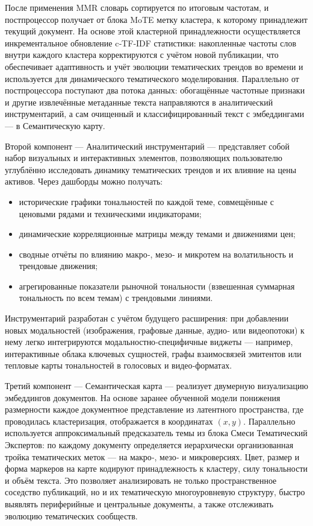 После применения MMR словарь сортируется по итоговым частотам, и постпроцессор получает от блока MoTE метку
кластера, к которому принадлежит текущий документ. На основе этой кластерной принадлежности осуществляется
инкрементальное обновление c‑TF‑IDF статистики: накопленные частоты слов внутри каждого кластера корректируются
с учётом новой публикации, что обеспечивает адаптивность и учёт эволюции тематических трендов во времени
и используется для динамического тематического моделирования. Параллельно от постпроцессора поступают два
потока данных: обогащённые частотные признаки и другие извлечённые метаданные текста направляются
в аналитический инструментарий, а сам очищенный и классифицированный текст с эмбеддингами --- в Семантическую карту.

Второй компонент --- Аналитический инструментарий --- представляет собой набор визуальных и интерактивных элементов,
позволяющих пользователю углублённо исследовать динамику тематических трендов и их влияние на цены активов.
Через дашборды можно получать:

\begin{itemize}
    \item исторические графики тональностей по каждой теме, совмещённые с ценовыми рядами и техническими индикаторами;
    \item динамические корреляционные матрицы между темами и движениями цен;
    \item сводные отчёты по влиянию макро‑, мезо‑ и микротем на волатильность и трендовые движения;
    \item агрегированные показатели рыночной тональности (взвешенная суммарная тональность по всем темам) с трендовыми линиями.
\end{itemize}

Инструментарий разработан с учётом будущего расширения: при добавлении новых модальностей
(изображения, графовые данные, аудио‑ или видеопотоки) к нему легко интегрируются модальностно‑специфичные
виджеты --- например, интерактивные облака ключевых сущностей, графы взаимосвязей эмитентов
или тепловые карты тональностей в голосовых и видео‑форматах.

Третий компонент --- Семантическая карта --- реализует двумерную визуализацию эмбеддингов документов.
На основе заранее обученной модели понижения размерности каждое документное представление из латентного
пространства, где проводилась кластеризация, отображается в координатах $(x,y)$. Параллельно используется
аппроксимальный предсказатель темы из блока Смеси Тематический Экспертов: по каждому документу
определяется иерархически организованная тройка тематических меток --- на макро‑, мезо‑ и микроверсиях.
Цвет, размер и форма маркеров на карте кодируют принадлежность к кластеру, силу тональности и объём
текста. Это позволяет анализировать не только пространственное соседство публикаций, но и их тематическую
многоуровневую структуру, быстро выявлять периферийные и центральные документы, а также отслеживать
эволюцию тематических сообществ.

